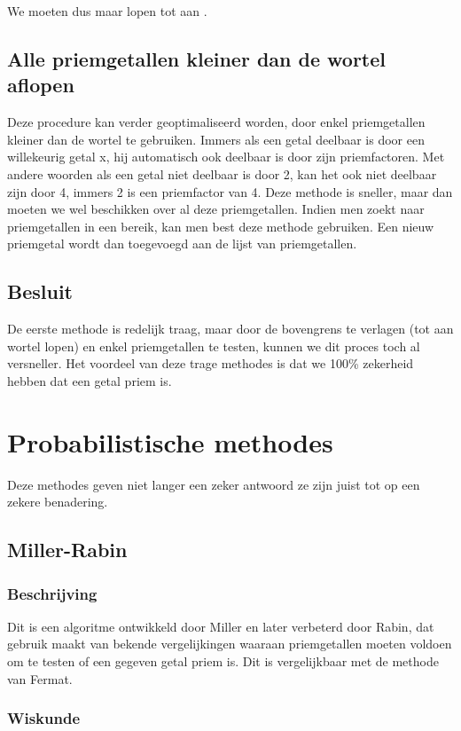 \documentclass[11pt]{article}
\begin{document}
We moeten dus maar lopen tot aan \left\lfloor {} \right\rfloor.

\subsection{Alle priemgetallen kleiner dan de wortel aflopen}
Deze procedure kan verder geoptimaliseerd worden, door enkel priemgetallen kleiner dan de wortel te gebruiken.
Immers als een getal deelbaar is door een willekeurig getal x, hij automatisch ook deelbaar is door zijn priemfactoren.
Met andere woorden als een getal niet deelbaar is door 2, kan het ook niet deelbaar zijn door 4, immers 2 is een priemfactor van 4.
Deze methode is sneller, maar dan moeten we wel beschikken over al deze priemgetallen. Indien men zoekt naar priemgetallen in een bereik, kan men best deze methode gebruiken. Een nieuw priemgetal wordt dan toegevoegd aan de lijst van priemgetallen.

\subsection{Besluit}
De eerste methode is redelijk traag, maar door de bovengrens te verlagen (tot aan wortel lopen) en enkel priemgetallen te testen, kunnen we dit proces toch al versneller. Het voordeel van deze trage methodes is dat we 100\% zekerheid hebben dat een getal priem is.

\clearpage
\section{Probabilistische methodes}
Deze methodes geven niet langer een zeker antwoord ze zijn juist tot op een zekere benadering.
\subsection{Miller-Rabin}
\subsubsection{Beschrijving}
Dit is een algoritme ontwikkeld door Miller en later verbeterd door Rabin, dat gebruik maakt van bekende vergelijkingen waaraan priemgetallen moeten voldoen om te testen of een gegeven getal priem is. Dit is vergelijkbaar met de methode van Fermat.

\subsubsection{Wiskunde}
\end{document}
